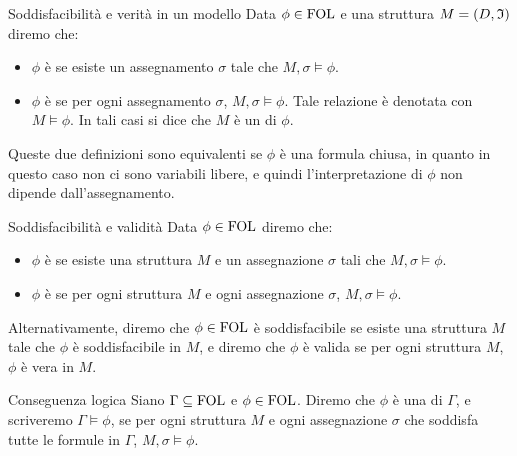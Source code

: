 \begin{definition}{Soddisfacibilità e verità in un modello}
  Data \(\phi \in \FOL\) e una struttura \(M = (D, \mathfrak{I}) \) diremo che:

  \begin{itemize}
    \item \(\phi\) è  se esiste un assegnamento \(\sigma\) tale che \(M,\sigma\models \phi\).
    \item \(\phi\) è  se per ogni assegnamento \(\sigma\), \(M,\sigma\models \phi\). Tale relazione è denotata con \(M\models \phi\). In tali casi si dice che \(M\) è un  di \(\phi\).
  \end{itemize}

  Queste due definizioni sono equivalenti se \(\phi\) è una formula chiusa, in quanto in questo caso non ci sono variabili libere, e quindi l'interpretazione di \(\phi\) non dipende dall'assegnamento. 

\end{definition}

\begin{definition}{Soddisfacibilità e validità}
  Data \(\phi \in \FOL\) diremo che:

  \begin{itemize}
    \item \(\phi\) è  se esiste una struttura \(M\) e un assegnazione \(\sigma\) tali che \(M,\sigma\models \phi\).
    \item \(\phi\) è  se per ogni struttura \(M\) e ogni assegnazione \(\sigma\), \(M,\sigma\models \phi\).
  \end{itemize}
  
\end{definition}

Alternativamente, diremo che \(\phi \in \FOL\) è soddisfacibile se esiste una struttura \(M\) tale che \(\phi\) è soddisfacibile in \(M\), e diremo che \(\phi\) è valida se per ogni struttura \(M\), \(\phi\) è vera in \(M\). 

\begin{definition}{Conseguenza logica}
  Siano \(\Gamma\subseteq \FOL\) e \(\phi\in\FOL\).
  Diremo che \(\phi\) è una  di \(\Gamma\), e scriveremo \(\Gamma\models \phi\), se per ogni struttura \(M\) e ogni assegnazione \(\sigma\) che soddisfa tutte le formule in \(\Gamma\), \(M,\sigma\models \phi\).
\end{definition}


